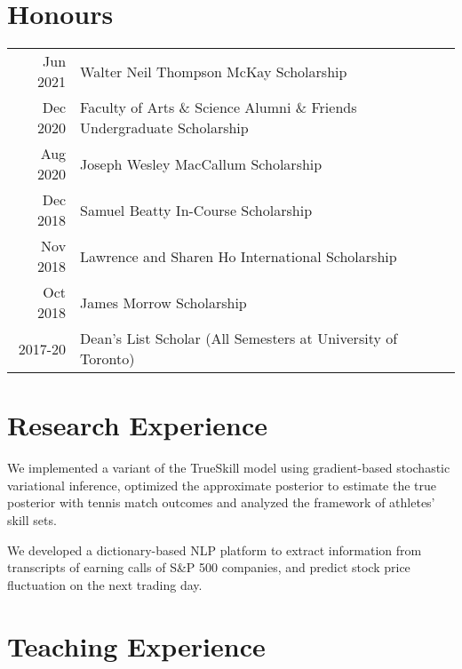 \documentclass[letterpaper]{deedy-resume} %
\begin{document}
\begin{minipage}[t]{0.66\textwidth}
\section{Honours} 

\begin{tabular}{rll}
Jun 2021	 & Walter Neil Thompson McKay Scholarship \\
Dec 2020	 & Faculty of Arts \& Science Alumni \& Friends Undergraduate Scholarship \\
Aug 2020	 & Joseph Wesley MacCallum Scholarship \\
Dec 2018	 & Samuel Beatty In-Course Scholarship \\
Nov 2018	 & Lawrence and Sharen Ho International Scholarship\\
Oct 2018	 & James Morrow Scholarship \\
2017-20		 & Dean's List Scholar (All Semesters at University of Toronto)
\end{tabular}

\sectionspace %



\section{Research Experience}
\small{We implemented a variant of the TrueSkill model using gradient-based stochastic variational inference, optimized the approximate posterior to estimate the true posterior with tennis match outcomes and analyzed the framework of athletes' skill sets.}

\sectionspace

\small {We developed a dictionary-based NLP platform to extract information from transcripts of earning calls of S\&P 500 companies, and predict stock price fluctuation on the next trading day.}

\sectionspace %


\section{Teaching Experience}


\end{minipage}
\end{document}

